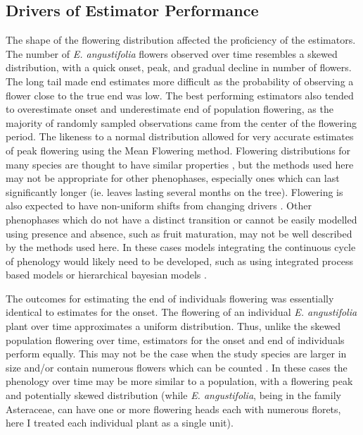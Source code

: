 \subsection{Drivers of Estimator Performance}

The shape of the flowering distribution affected the proficiency of the estimators. The number of \textit{E. angustifolia} flowers observed over time resembles a skewed distribution, with a quick onset, peak, and gradual decline in number of flowers. The long tail made end estimates more difficult as the probability of observing a flower close to the true end was low. The best performing estimators also tended to overestimate onset and underestimate end of population flowering, as the majority of randomly sampled observations came from the center of the flowering period. The likeness to a normal distribution allowed for very accurate estimates of peak flowering using the Mean Flowering method. Flowering distributions for many species are thought to have similar properties \citep{forrest2010, clark2011}, but the methods used here may not be appropriate for other phenophases, especially ones which can last significantly longer (ie. leaves lasting several months on the tree). Flowering is also expected to have non-uniform shifts from changing drivers \citep{ogilvie2017a, theobald2017}. Other phenophases which do not have a distinct transition or cannot be easily modelled using presence and absence, such as fruit maturation, may not be well described by the methods used here. In these cases models integrating the continuous cycle of phenology would likely need to be developed, such as using integrated process based models \citep{chuine2017} or hierarchical bayesian models \citep{clark2014a}.  

The outcomes for estimating the end of individuals flowering was essentially identical to estimates for the onset. The flowering of an individual \textit{E. angustifolia} plant over time approximates a uniform distribution. Thus, unlike the skewed population flowering over time, estimators for the onset and end of individuals perform equally. This may not be the case when the study species are larger in size and/or contain numerous flowers which can be counted \citep{renzi2019}. In these cases the phenology over time may be more similar to a population, with a flowering peak and potentially skewed distribution (while \textit{E. angustifolia}, being in the family Asteraceae, can have one or more flowering heads each with numerous florets, here I treated each individual plant as a single unit).

